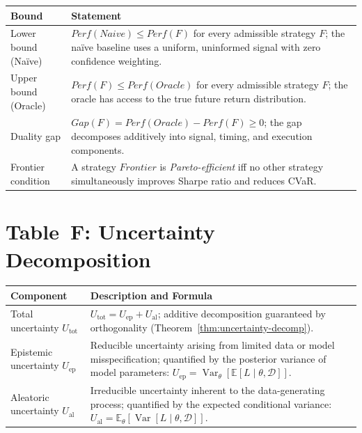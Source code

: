 \documentclass[12pt,openany]{book}
\newcommand{\E}{\mathbb{E}}
\numberwithin{equation}{chapter}
\theoremstyle{plain}
\theoremstyle{definition}
\theoremstyle{remark}
\numberwithin{equation}{chapter}
\theoremstyle{plain}
\DeclareMathOperator{\Var}{Var}
\newcommand{\Naive}{N}
\newcommand{\Oracle}{O}
\newcommand{\Frontier}{F}
\newcommand{\Gap}{\mathcal{G}}
\newcommand{\Perf}{\mathrm{Perf}}
\def\Naive{Naive}%
\def\Oracle{Oracle}%
\def\Frontier{Frontier}%
\def\Gap{Gap}%
\def\Perf{Perf}%
\begin{document}
\begin{center}
\begin{tabularx}{\textwidth}{@{} l X @{}}
\hline
\textbf{Bound} & \textbf{Statement} \\
\hline
Lower bound (Na\"{i}ve) &
  $\Perf(\Naive) \le \Perf(F)$ for every admissible strategy $F$;
  the na\"{i}ve baseline uses a uniform, uninformed signal with zero
  confidence weighting. \\
\addlinespace
Upper bound (Oracle) &
  $\Perf(F) \le \Perf(\Oracle)$ for every admissible strategy $F$;
  the oracle has access to the true future return distribution. \\
\addlinespace
Duality gap &
  $\Gap(F) = \Perf(\Oracle) - \Perf(F) \ge 0$; the gap decomposes
  additively into signal, timing, and execution components. \\
\addlinespace
Frontier condition &
  A strategy $\Frontier$ is \emph{Pareto-efficient} iff no other strategy
  simultaneously improves Sharpe ratio and reduces CVaR. \\
\hline
\end{tabularx}
\end{center}

\section*{Table~F: Uncertainty Decomposition}

\begin{center}
\begin{tabularx}{\textwidth}{@{} l X @{}}
\hline
\textbf{Component} & \textbf{Description and Formula} \\
\hline
Total uncertainty $U_{\mathrm{tot}}$ &
  $U_{\mathrm{tot}} = U_{\mathrm{ep}} + U_{\mathrm{al}}$; additive
  decomposition guaranteed by orthogonality
  (Theorem~\ref{thm:uncertainty-decomp}). \\
\addlinespace
Epistemic uncertainty $U_{\mathrm{ep}}$ &
  Reducible uncertainty arising from limited data or model misspecification;
  quantified by the posterior variance of model parameters:
  $U_{\mathrm{ep}} = \Var_\theta[\E[L\mid\theta,\mathcal{D}]]$. \\
\addlinespace
Aleatoric uncertainty $U_{\mathrm{al}}$ &
  Irreducible uncertainty inherent to the data-generating process;
  quantified by the expected conditional variance:
  $U_{\mathrm{al}} = \E_\theta[\Var[L\mid\theta,\mathcal{D}]]$. \\
\hline
\end{tabularx}
\end{center}
\end{document}
